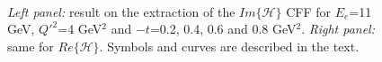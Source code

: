 \begin{figure}[t]
\begin{center}
\mbox{
 \quad
{}}
\end{center}
\caption{\small{
{\it Left panel:} result on the extraction of the $Im\{\mathcal{H}\}$ CFF 
for $E_e$=11 GeV, $Q'^2$=4 GeV$^2$ and $-t$=0.2, 0.4, 0.6 and 0.8 GeV$^2$.
{\it Right panel:} same for $Re\{\mathcal{H}\}$.
Symbols and curves are described in the text.}}
\label{fig:TCS_fits}
\end{figure}

